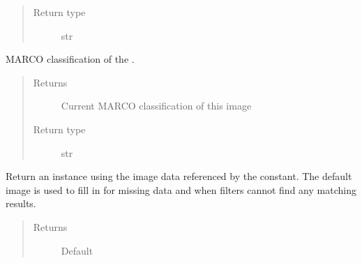 \documentclass[letterpaper,10pt,english]{sphinxmanual}
\begin{document}
\begin{fulllineitems}
\begin{fulllineitems}
\begin{quote}
\begin{description}
\item[{Return type}] \leavevmode
str

\end{description}\end{quote}

\end{fulllineitems}


\begin{fulllineitems}
\label{\detokenize{polo.crystallography:polo.crystallography.image.Image.machine_class}}
MARCO classification of the {\hyperref[\detokenize{polo.crystallography:polo.crystallography.image.Image}]{}}.
\begin{quote}\begin{description}
\item[{Returns}] \leavevmode
Current MARCO classification of this image

\item[{Return type}] \leavevmode
str

\end{description}\end{quote}

\end{fulllineitems}


\begin{fulllineitems}
\label{\detokenize{polo.crystallography:polo.crystallography.image.Image.no_image}}
Return an {\hyperref[\detokenize{polo.crystallography:polo.crystallography.image.Image}]{}} 
instance using the image data referenced by the
 constant.
The default image is used to fill in for missing 
data and when filters cannot find any matching results.
\begin{quote}\begin{description}
\item[{Returns}] \leavevmode
Default {\hyperref[\detokenize{polo.crystallography:polo.crystallography.image.Image}]{}}


\end{description}
\end{quote}
\end{fulllineitems}
\end{fulllineitems}
\end{document}
